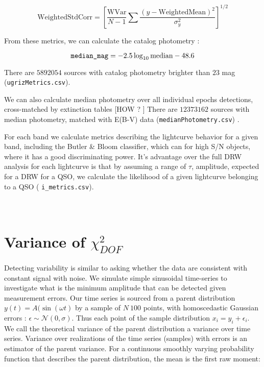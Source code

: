 \documentclass[fleqn,usenatbib]{mnras}  %
\begin{document}
\begin{equation}
\mbox{WeightedStdCorr} =  \left[ \frac{ \mbox{WVar}  }{N-1} \sum{\frac{(y-\mbox{WeightedMean})^{2}}{\sigma_{y}^{2}}} \right] ^{1/2}
\end{equation}


From these metrics, we can calculate the catalog photometry  :

\begin{equation}
\verb|median_mag| = -2.5 \log_{10}\mbox{median} - 48.6
\end{equation}

There are  $5892054$ sources with catalog photometry brighter than $23$ mag  (\verb|ugrizMetrics.csv|). 

We can also calculate median photometry over all individual epochs  detections, cross-matched by extinction tables [HOW ? ]  There are $12373162$ sources with median photometry, matched with E(B-V) data (\verb|medianPhotometry.csv|) . 

For each band we calculate metrics describing the lightcurve behavior for a given band, including the Butler \& Bloom classifier, which can  for high S/N objects, where it has a good discriminating power. It's advantage over the full DRW analysis for each lightcurve is that by assuming a range of $\tau$, amplitude, expected for a DRW for a QSO, we calculate the likelihood of a given lightcurve belonging to a QSO ( \verb|i_metrics.csv|). 

\section{\\ Variance of $\chi^{2}_{DOF}$ }
\label{App:AppendixD}

Detecting variability is similar to asking whether the data are consistent with constant signal with noise. We simulate simple sinusoidal time-series to investigate what is the minimum amplitude that can be detected given measurement errors. Our time series is sourced from a parent distribution $y(t) = A(\sin(\omega t)$ by a sample of $N~100$ points, with homoscedastic Gaussian errors :  $\epsilon \sim \mathcal{N}(0,\sigma)$.  Thus each point of the sample distribution $x_{i} = y_{i} + \epsilon_{i}$. We call the theoretical variance of the parent distribution a variance over time series. Variance over realizations of the time series (samples) with errors is an estimator of the parent variance.  For a continuous smoothly varying probability function that describes the parent distribution, the mean is the first raw moment:
\end{document}
